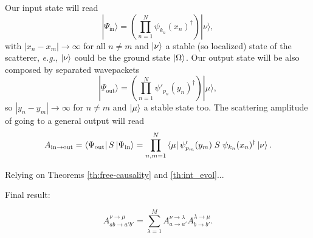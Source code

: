 \documentclass[notitlepage, prx, preprint, amsmath,superscriptaddress,amssymb]{revtex4-1}
\begin{document}
Our input state will read
\begin{equation}
|\Psi_\text{in}\rangle = \left(\prod_{n=1}^N \psi_{k_n}(x_n)^\dagger \right)|\nu\rangle,
\end{equation}
with $|x_n-x_m|\to\infty$ for all $n\neq m$ and $\ket{\nu}$ a stable (so localized) state of the scatterer, \emph{e.g.}, $\ket{\nu}$ could be the ground state $\ket{\Omega}$. Our output state will be also composed by separated wavepackets
\begin{equation}
|\Psi_\text{out}\rangle = \left(\prod_{n=1}^N \psi'_{p_n}(y_n)^\dagger \right)|\mu\rangle,
\end{equation}
so $|y_n-y_m|\to\infty$ for $n\neq m$ and $\ket{\mu}$ a stable state too. The scattering amplitude of going to a general output will read
\begin{equation}
A_{\text{in}\to\text{out}}=\bra{\Psi_\text{out}}S\ket{\Psi_\text{in}}=\prod_{n,m=1}^N \bra{\mu}\psi'_{p_m}(y_m)\;S\;\psi_{k_n}(x_n)^\dagger\ket{\nu}.
\end{equation}

Relying on Theorems \ref{th:free-causality} and \ref{th:int_evol}...

{\color{red}Final result:}

\begin{equation}\label{eq:A}
A_{ab\to a'b'}^{\nu\to\mu} =  \sum_{\lambda=1}^M A_{a\to a'}^{\nu\to\lambda} A_{b\to b'}^{\lambda\to\mu}.
\end{equation}
\end{document}

